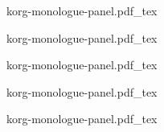\documentclass[11pt, a4paper]{article}
\newcommand{\incfig}[1]{%
    \def\svgwidth{\columnwidth}
    {#1.pdf_tex}
}
\begin{document}
\begin{figure}[!h]
\centering
\incfig{korg-monologue-panel}
\incfig{korg-monologue-panel}
\incfig{korg-monologue-panel}
\incfig{korg-monologue-panel}
\incfig{korg-monologue-panel}
\end{figure}
\end{document}
